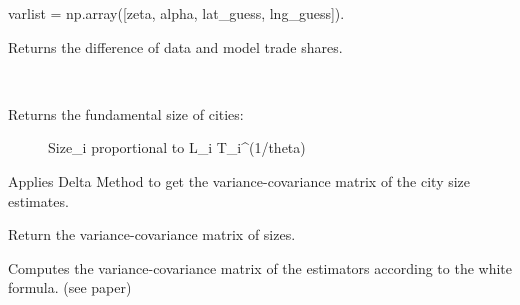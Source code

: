 \documentclass[letterpaper,10pt,english]{sphinxmanual}
\begin{document}
\begin{fulllineitems}
\begin{fulllineitems}
\label{\detokenize{index:estimate.Estimate.get_errors}}
varlist = np.array({[}zeta, alpha, lat\_guess, lng\_guess{]}).

Returns the difference of data and model trade shares.

\end{fulllineitems}


\begin{fulllineitems}
\label{\detokenize{index:estimate.Estimate.get_size}}~\begin{description}
\item[{Returns the fundamental size of cities:}] \leavevmode
Size\_i proportional to L\_i T\_i\textasciicircum{}(1/theta)

\end{description}

\end{fulllineitems}


\begin{fulllineitems}
\label{\detokenize{index:estimate.Estimate.get_size_variance}}
Applies Delta Method to get the variance-covariance matrix of the city
size estimates.

Return the variance-covariance matrix of sizes.

\end{fulllineitems}


\begin{fulllineitems}
\label{\detokenize{index:estimate.Estimate.get_variance}}
Computes the variance-covariance matrix of the estimators according to
the white formula. (see paper)

\end{fulllineitems}


\end{fulllineitems}
\end{document}
